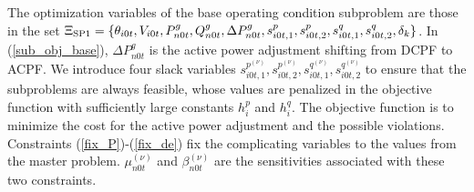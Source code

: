 \documentclass[journal]{IEEEtran}
\newcommand{\splitatcommas}[1]{%
	\begingroup
	\begingroup\lccode`~=`, \lowercase{\endgroup
		\edef~{\mathchar\the\mathcode`, \penalty0 \noexpand\hspace{0pt plus 1em}}%
	}\mathcode`,="8000 #1%
	\endgroup
}
\begin{document}
The optimization variables of the base operating condition subproblem are those in the set $\splitatcommas{\Xi_{\text{SP1}}=\{\theta_{i0t},V_{i0t},P^g_{n0t},Q^g_{n0t},\Delta P^g_{n0t},s^p_{i0t,1},s^p_{i0t,2},s^q_{i0t,1},s^q_{i0t,2},\delta_k \}}$. In (\ref{sub_obj_base}), $\Delta P^g_{n0t}$ is the active power adjustment shifting from DCPF to ACPF. We introduce four slack variables $s_{i0t,1}^{p^{(\nu)}},s_{i0t,2}^{p^{(\nu)}},s_{i0t,1}^{q^{(\nu)}},s_{i0t,2}^{q^{(\nu)}}$ to ensure that the subproblems are always feasible, whose values are penalized in the objective function with sufficiently large constants $h^p_i$ and $h_i^q$. The objective function is to minimize the cost for the active power adjustment and the possible violations. Constraints (\ref{fix_P})-(\ref{fix_de}) fix the complicating variables to the values from the master problem. $\mu^{(\nu)}_{n0t}$ and $\beta^{(\nu)}_{n0t}$ are the sensitivities associated with these two constraints. 
\end{document}
